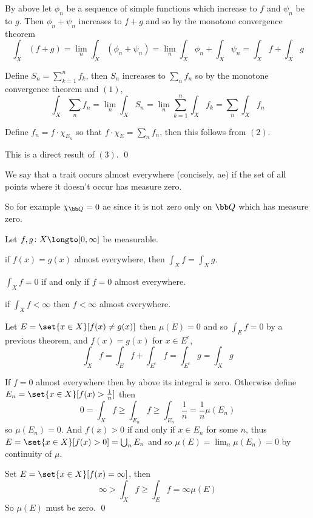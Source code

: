 \ethrm

\Proof\benum
    \item By above let $\phi_n$ be a sequence of simple functions which increase to $f$ and $\psi_n$ be to $g$.
        Then $\phi_n+\psi_n$ increases to $f+g$ and so by the monotone convergence theorem
        $$ \int_X(f+g) = \lim_n\int_X(\phi_n+\psi_n) = \lim_n\int_X\phi_n+\int_X\psi_n = \int_Xf + \int_Xg $$
    \item Define $S_n=\sum_{k=1}^nf_k$, then $S_n$ increases to $\sum_nf_n$ so by the monotone convergence theorem and $(1)$,
        $$ \int_X\sum_nf_n = \lim_n\int_XS_n = \lim_n\sum_{k=1}^n\int_Xf_k = \sum_n\int_Xf_n $$
    \item Define $f_n=f\cdot\chi_{E_n}$ so that $f\cdot\chi_E=\sum_nf_n$, then this follows from $(2)$.
    \item This is a direct result of $(3)$.
        \qed
\eenum

\bdefn

    We say that a trait occurs {\emphcolor almost everywhere} (concisely, ae) if the set of all points where it doesn't occur has measure zero.

\edefn

So for example $\chi_{\bb Q}=0$ ae since it is not zero only on ${\bb Q}$ which has measure zero.

\bthrm

    Let $f,g\colon X\longto[0,\infty]$ be measurable.
    \benum
        \item if $f(x)=g(x)$ almost everywhere, then $\int_Xf=\int_Xg$.
        \item $\int_Xf=0$ if and only if $f=0$ almost everywhere.
        \item if $\int_Xf<\infty$ then $f<\infty$ almost everywhere.
    \eenum

\ethrm

\benum
    \item Let $E=\set{x\in X}[f(x)\neq g(x)]$ then $\mu(E)=0$ and so $\int_Ef=0$ by a previous theorem, and $f(x)=g(x)$ for $x\in E^c$,
        $$ \int_Xf = \int_Ef + \int_{E^c}f = \int_{E^c}g = \int_Xg $$
    \item If $f=0$ almost everywhere then by above its integral is zero.
        Otherwise define $E_n=\set{x\in X}[f(x)>\frac1n]$ then
        $$ 0 = \int_Xf \geq \int_{E_n}f \geq \int_{E_n}\frac1n = \frac1n\mu(E_n) $$
        so $\mu(E_n)=0$.
        And $f(x)>0$ if and only if $x\in E_n$ for some $n$, thus $E=\set{x\in X}[f(x)>0]=\bigcup_nE_n$ and so $\mu(E)=\lim_n\mu(E_n)=0$ by continuity of $\mu$.
    \item Set $E=\set{x\in X}[f(x)=\infty]$, then
        $$ \infty > \int_Xf \geq \int_Ef = \infty\mu(E) $$
        So $\mu(E)$ must be zero.
        \qed
\eenum

